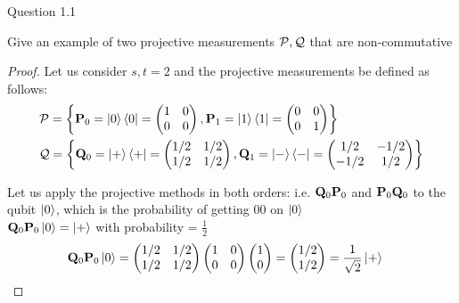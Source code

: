 \begin{solution}{Question 1.1}\label{ques:x}
    \begin{question}
    Give an example of two projective measurements $\mathcal{P} , \mathcal{Q}$ that are non-commutative
    \end{question}
    \tcblower{}
    \begin{proof}
    Let us consider $s,t=2$ and the projective measurements be defined as follows:
    \begin{equation}
        \begin{split}
        &\mathcal{P} = \left\{ \mathbf{P}_0 = \ket{0}\bra{0} = 
        \begin{pmatrix}
        1 & 0\\
        0 & 0 
        \end{pmatrix}  
        , \mathbf{P}_1 = \ket{1}\bra{1} =
        \begin{pmatrix}
        0 & 0\\
        0 & 1 
        \end{pmatrix}  \right\}\\
        &\mathcal{Q} = \left\{ \mathbf{Q}_0 = \ket{+}\bra{+} =
        \begin{pmatrix}
        1/2 & 1/2\\
        1/2 & 1/2
        \end{pmatrix}  
        , \mathbf{Q}_1 = \ket{-}\bra{-} =
        \begin{pmatrix}
        1/2 & -1/2\\
        -1/2 & 1/2 
        \end{pmatrix}  \right\}
        \end{split}
    \end{equation}

    Let us apply the projective methods in both orders: i.e. $\mathbf{Q}_0\mathbf{P}_0$ and $\mathbf{P}_0\mathbf{Q}_0$ to the qubit $\ket{0}$, which is the probability of getting 00 on $\ket{0}$\\

     $\mathbf{Q}_0\mathbf{P}_0\ket{0}=\ket{+}$ with probability = $\frac{1}{2}$
     \begin{equation}
         \begin{split}
            &\mathbf{Q}_0\mathbf{P}_0\ket{0} = 
            \begin{pmatrix}
            1/2 & 1/2\\
            1/2 & 1/2 
            \end{pmatrix}
            \begin{pmatrix}
            1 & 0\\
            0 & 0 
            \end{pmatrix}
            \begin{pmatrix}
            1 \\
            0 
            \end{pmatrix} =
            \begin{pmatrix}
            1/2 \\
            1/2 
            \end{pmatrix} = 
            \frac{1}{\sqrt{2}}\ket{+}
        \end{split}
     \end{equation}


\end{proof}
\end{solution}
